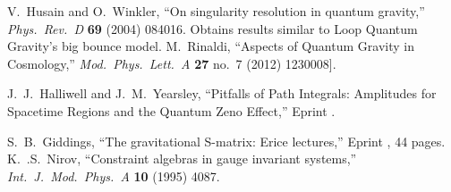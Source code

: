 \begin{thebibliography}{99}
  V.~Husain and O.~Winkler,\newblock
  ``On singularity resolution in quantum gravity,''\newblock
  \emph{Phys.\ Rev.\ D} {\bf 69} (2004) 084016\newblock
  [\arXiv{gr-qc/0312094}]. Obtains results similar to Loop
  Quantum Gravity's big bounce model.
  M.~Rinaldi,\newblock
  ``Aspects of Quantum Gravity in Cosmology,''\newblock
  \emph{Mod.\ Phys.\ Lett.\ A} {\bf 27} no.~7 (2012) 1230008\newblock
  [\arXiv[gr-qc]{1201.4543}].




  J.~J.~Halliwell and J.~M.~Yearsley,\newblock
  ``Pitfalls of Path Integrals: Amplitudes for Spacetime Regions and the Quantum Zeno Effect,''\newblock
  Eprint .

  S.~B.~Giddings,\newblock
  ``The gravitational S-matrix: Erice lectures,''\newblock
  Eprint , 44 pages.
  K.~.S.~Nirov,\newblock
  ``Constraint algebras in gauge invariant systems,''\newblock
  \emph{Int.\ J.\ Mod.\ Phys.\ A} {\bf 10} (1995) 4087.
\end{thebibliography}
